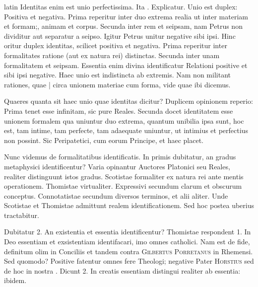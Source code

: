\begin{otherlanguage*}{latin}
\pstart
 Identitas enim est unio perfectissima. Ita . Explicatur. Unio est duplex: Positiva et negativa. Prima reperitur inter duo extrema realia ut inter materiam et formam;, animam et corpus. Secunda inter rem et seipsam, nam Petrus non dividitur aut separatur a seipso. Igitur Petrus unitur negative sibi ipsi. Hinc oritur duplex identitas, scilicet positiva et negativa. Prima reperitur inter formalitates ratione (aut ex natura rei) distinctas. Secunda inter unam formalitatem et seipsam. Essentia enim divina identificatur Relationi positive et sibi ipsi negative. Haec unio est indistincta ab extremis. Nam non militant rationes, quae \textnormal{|}  circa unionem materiae cum forma, vide quae ibi dicemus. 
\pend

\pstart
 Quaeres quanta sit haec unio quae identitas dicitur? Duplicem opinionem reperio: Prima tenet esse infinitam, sic pure Reales. Secunda docet identitatem esse unionem formalem qua uniuntur duo extrema, quantum unibilia ipsa sunt, hoc est, tam intime, tam perfecte, tam adaequate uniuntur, ut intimius et perfectius non possint. Sic Peripatetici, cum eorum Principe, et haec placet. 
\pend

\pstart
 Nunc videmus de formalitatibus identificatis. In primis dubitatur, an gradus metaphysici identificentur? Varia opinantur Auctores Platonici seu Reales, realiter distinguunt istos gradus. Scotistae formaliter ex natura rei ante mentis operationem. Thomistae virtualiter. Expressivi secundum clarum et obscurum conceptus. Connotatistae secundum diversos terminos, et alii aliter. Unde Scotistae et Thomistae admittunt realem identificationem. Sed hoc postea uberius tractabitur. 
\pend

\pstart
 Dubitatur 2. An existentia et essentia identificentur? Thomistae respondent 1. In Deo essentiam et exsistentiam identifacari, imo omnes catholici. Nam est de fide, definitum olim in Conciliis et tandem contra \textsc{Gilbertus Porretanus} in Rhemensi. Sed quomodo? Positive fatentur omnes fere Theologi; negative Pater \textsc{Horstius} sed de hoc in nostra . Dicunt 2. In creatis essentiam distingui realiter ab essentia: ibidem. 
\pend


\end{otherlanguage*}
